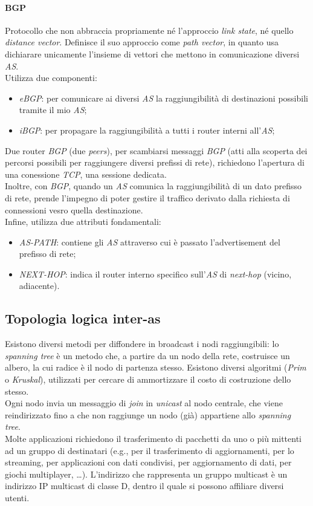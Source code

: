 \paragraph{BGP}
Protocollo che non abbraccia propriamente né l'approccio \textit{link state}, né quello \textit{distance vector}. Definisce il suo approccio come \textit{path vector}, in quanto usa dichiarare unicamente l'insieme di vettori che mettono in comunicazione diversi \textit{AS}. \\
Utilizza due componenti:
\begin{itemize}
	\item \textit{eBGP}: per comunicare ai diversi \textit{AS} la raggiungibilità di destinazioni possibili tramite il mio \textit{AS};
	\item \textit{iBGP}: per propagare la raggiungibilità a tutti i router interni all'\textit{AS};
\end{itemize}
Due router \textit{BGP} (due \textit{peers}), per scambiarsi messaggi \textit{BGP} (atti alla scoperta dei percorsi possibili per raggiungere diversi prefissi di rete), richiedono l'apertura di una conessione \textit{TCP}, una sessione dedicata. \\
Inoltre, con \textit{BGP}, quando un \textit{AS} comunica la raggiungibilità di un dato prefisso di rete, prende l'impegno di poter gestire il traffico derivato dalla richiesta di connessioni vesro quella destinazione. \\
Infine, utilizza due attributi fondamentali:
\begin{itemize}
	\item \textit{AS-PATH}: contiene gli \textit{AS} attraverso cui è passato l'advertisement del prefisso di rete;
	\item \textit{NEXT-HOP}: indica il router interno specifico sull'\textit{AS} di \textit{next-hop} (vicino, adiacente).
\end{itemize}

\subsection{Topologia logica inter-as}
Esistono diversi metodi per diffondere in broadcast i nodi raggiungibili: lo \textit{spanning tree} è un metodo che, a partire da un nodo della rete, costruisce un albero, la cui radice è il nodo di partenza stesso. Esistono diversi algoritmi (\textit{Prim} o \textit{Kruskal}), utilizzati per cercare di ammortizzare il costo di costruzione dello stesso. \\
Ogni nodo invia un messaggio di \textit{join} in \textit{unicast} al nodo centrale, che viene reindirizzato fino a che non raggiunge un nodo (già) appartiene allo \textit{spanning tree}. \\
Molte applicazioni richiedono il trasferimento di pacchetti da uno o più mittenti ad un gruppo di destinatari (e.g., per il trasferimento di aggiornamenti, per lo streaming, per applicazioni con dati condivisi, per aggiornamento di dati, per giochi multiplayer, \ldots). L'indirizzo che rappresenta un gruppo multicast è un indirizzo IP multicast di classe D, dentro il quale si possono affiliare diversi utenti.

